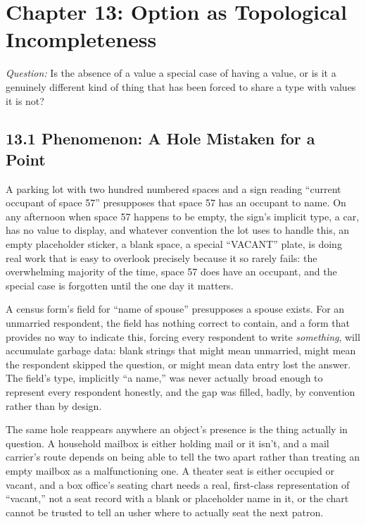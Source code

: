 \documentclass[11pt]{book}
\begin{document}
\clearpage

\chapter*{Chapter 13: Option as Topological Incompleteness}

\begin{firstprinciples}
\textit{Question:} Is the absence of a value a special case of having a value, or is it a genuinely different kind of thing that has been forced to share a type with values it is not?
\end{firstprinciples}

\section*{13.1 Phenomenon: A Hole Mistaken for a Point}

A parking lot with two hundred numbered spaces and a sign reading ``current occupant of space 57'' presupposes that space 57 has an occupant to name. On any afternoon when space 57 happens to be empty, the sign's implicit type, a car, has no value to display, and whatever convention the lot uses to handle this, an empty placeholder sticker, a blank space, a special ``VACANT'' plate, is doing real work that is easy to overlook precisely because it so rarely fails: the overwhelming majority of the time, space 57 does have an occupant, and the special case is forgotten until the one day it matters.

A census form's field for ``name of spouse'' presupposes a spouse exists. For an unmarried respondent, the field has nothing correct to contain, and a form that provides no way to indicate this, forcing every respondent to write \emph{something}, will accumulate garbage data: blank strings that might mean unmarried, might mean the respondent skipped the question, or might mean data entry lost the answer. The field's type, implicitly ``a name,'' was never actually broad enough to represent every respondent honestly, and the gap was filled, badly, by convention rather than by design.

The same hole reappears anywhere an object's presence is the thing actually in question. A household mailbox is either holding mail or it isn't, and a mail carrier's route depends on being able to tell the two apart rather than treating an empty mailbox as a malfunctioning one. A theater seat is either occupied or vacant, and a box office's seating chart needs a real, first-class representation of ``vacant,'' not a seat record with a blank or placeholder name in it, or the chart cannot be trusted to tell an usher where to actually seat the next patron.
\end{document}
